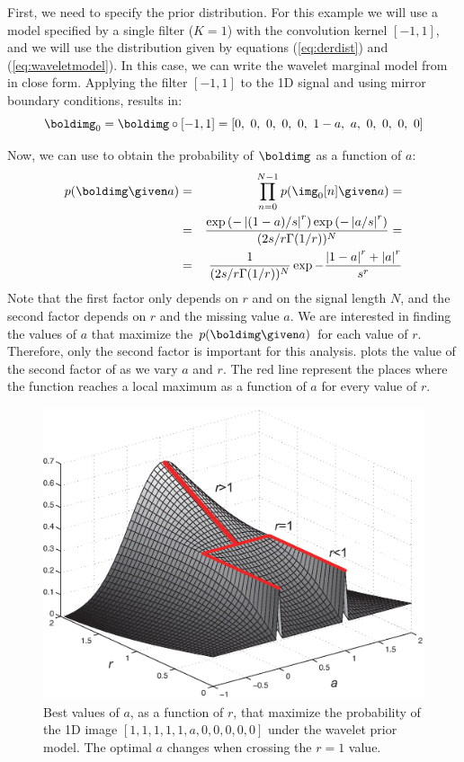 First, we need to specify the prior distribution. For this example we will use a model specified by a single filter ($K=1$) with the convolution kernel $[-1, 1]$, and we will use the distribution given by equations (\ref{eq:derdist}) and (\ref{eq:waveletmodel}). In this case, we can write the wavelet marginal model from \eqn{\ref{eq:waveletmodel}} in close form. Applying the filter $\left[-1, 1\right]$ to the 1D signal and using mirror boundary conditions, results in:
\begin{equation}
\boldimg_0 = \boldimg \circ \left[-1, 1\right] = \left[0,~0,~ 0,~0,~ 0,~ 1-a,~ a,~ 0,~ 0,~ 0,~ 0\right]
\end{equation}

Now, we can use \eqn{\ref{eq:waveletmodel}} to obtain the probability of $\boldimg$ as a function of $a$:
\begin{eqnarray}
p(\boldimg \given a) &=& \prod_{n=0}^{N-1} p(\img_0 [n]  \given a) = \\ %
&=&\frac {\exp \left(- \left| (1-a)/s  \right|^r \right) \exp \left(- \left| a/s  \right|^r \right)}{(2s/r \Gamma(1/r))^N} =\\
&=&\frac{1}{(2s/r \Gamma(1/r))^N} \exp - \frac{\left| 1-a \right|^r+\left| a \right|^r} {s^r}  
\label{eq:best_a_eqn}
\end{eqnarray}
Note that the first factor only depends on $r$ and on the signal length $N$, and the second factor depends on $r$ and the missing value $a$. We are interested in finding the values of $a$ that maximize the $p(\boldimg \given a)$ for each value of $r$. Therefore, only the second factor is important for this analysis. \Fig{\ref{fig:surface_best_a}} plots the value of the second factor of \eqn{\ref{eq:best_a_eqn}} as we vary $a$ and $r$. The red line represent the places where the function reaches a local maximum as a function of $a$ for every value of $r$.

\begin{figure}[t]
\centerline{
\includegraphics[width=.6\linewidth]{figures/statistical_image_models/best_a_s1.eps}
} 
\caption{Best values of $a$, as a function of $r$, that maximize the probability of the 1D image $\left[1,1,1,1,1,a,0,0,0,0,0 \right]$ under the wavelet prior model. The optimal $a$ changes when crossing the $r=1$ value.} 
\label{fig:surface_best_a}
\end{figure}


